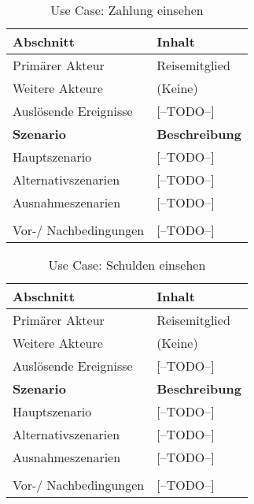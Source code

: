 \begin{table}[H]
	\footnotesize
	\caption{Use Case: Zahlung einsehen}
	\begin{tabularx}{0.95\textwidth}{ |l|X| }
		\hline
		\rowcolor{gray} \textbf{Abschnitt}     & \textbf{Inhalt}       \\
		\hline
		Primärer Akteur                        & Reisemitglied         \\
		\hline
		Weitere Akteure                        & (Keine)               \\
		\hline
		Auslösende Ereignisse                  & [--TODO--]            \\
		\hline
		\rowcolor{lightgray} \textbf{Szenario} & \textbf{Beschreibung} \\
		\hline
		Hauptszenario                          & [--TODO--]            \\
		\hline
		Alternativszenarien                    & [--TODO--]            \\
		\hline
		Ausnahmeszenarien                      & [--TODO--]            \\
		\hline
		\rowcolor{lightgray}                   &                       \\
		\hline
		Vor-/ Nachbedingungen                  & [--TODO--]            \\
		\hline
	\end{tabularx}
\end{table}


\begin{table}[H]
	\footnotesize
	\caption{Use Case: Schulden einsehen}
	\begin{tabularx}{0.95\textwidth}{ |l|X| }
		\hline
		\rowcolor{gray} \textbf{Abschnitt}     & \textbf{Inhalt}       \\
		\hline
		Primärer Akteur                        & Reisemitglied         \\
		\hline
		Weitere Akteure                        & (Keine)               \\
		\hline
		Auslösende Ereignisse                  & [--TODO--]            \\

		\hline
		\rowcolor{lightgray} \textbf{Szenario} & \textbf{Beschreibung} \\
		\hline
		Hauptszenario                          & [--TODO--]            \\
		\hline
		Alternativszenarien                    & [--TODO--]            \\
		\hline
		Ausnahmeszenarien                      & [--TODO--]            \\
		\hline
		\rowcolor{lightgray}                   &                       \\
		\hline
		Vor-/ Nachbedingungen                  & [--TODO--]            \\
		\hline
	\end{tabularx}
\end{table}


